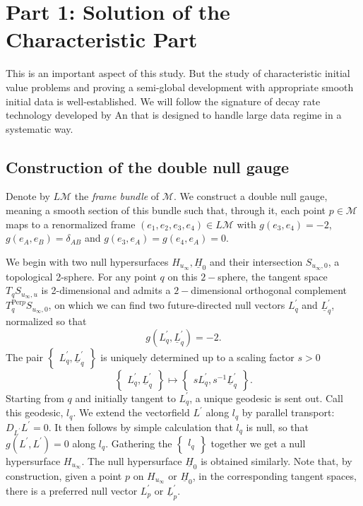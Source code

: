 \documentclass{amsart}
\newcommand{\Lbar}{\underline{L}}
\newcommand{\Hbar}{\underline{H}}
\begin{document}
 \section{Part 1: Solution of the Characteristic Part}
 \label{semiglobal}
 \noindent This is an important aspect of this study. But the study of characteristic initial value problems and proving a semi-global development with appropriate smooth initial data is well-established. We will follow the signature of decay rate technology developed by An \cite{An} that is designed to handle large data regime in a systematic way.
	\subsection{Construction of the double null gauge}
	
	
\noindent Denote by $L\mathcal{M}$ the \textit{frame bundle} of $\mathcal{M}$. We construct a double null gauge, meaning a smooth section of this bundle such that, through it, each point $p \in \mathcal{M}$ maps to a renormalized frame $(e_1, e_2, e_3, e_4) \in L\mathcal{M}$ with $g(e_3, e_4) =-2$, $g(e_A, e_B) = \delta_{AB}$ and $g(e_3, e_A) = g(e_4, e_A) =0$.
    
    \vspace{3mm}
  \noindent  We begin with two null hypersurfaces $H_{u_{\infty}}, \Hbar_0$ and their intersection $S_{u_{\infty},0}$, a topological 2-sphere. For any point $q$ on this $2-$sphere, the tangent space $T_qS_{u_{\infty},u}$ is 2-dimensional and admits a $2-$dimensional orthogonal complement $T_q^{\text{Per}p}{S_{u_{\infty},0}}$, on which we can find two future-directed null vectors $L^{\prime}_q$ and $\Lbar^{\prime}_q$, normalized so that  \[ g(L^{\prime}_q, \Lbar^{\prime}_q) = -2. \]The pair $\begin{Bmatrix} L^{\prime}_q, \Lbar^{\prime}_q\end{Bmatrix}$ is uniquely determined up to a scaling factor $s >0$ \[\begin{Bmatrix} L^{\prime}_q, \Lbar^{\prime}_q\end{Bmatrix} \mapsto \begin{Bmatrix} s L^{\prime}_q, s^{-1}\Lbar^{\prime}_q\end{Bmatrix}.\]
	Starting from $q$ and initially tangent to $L^{\prime}_q$, a unique geodesic is sent out. Call this geodesic, $l_q$. We extend the vectorfield $L^{\prime}$ along $l_q$ by parallel transport: $D_{L^{\prime}}L^{\prime} =0$. It then follows by simple calculation that $l_q$ is null, so that $g(L^{\prime}, L^{\prime}) =0$ along $l_q$. Gathering the $\begin{Bmatrix} l_q \end{Bmatrix}$ together we get a null hypersurface $H_{u_{\infty}}$. The null hypersurface $\Hbar_0$ is obtained similarly.
	Note that, by construction, given a point $p$ on $H_{u_{\infty}}$ or $\Hbar_0$, in the corresponding tangent spaces, there is a preferred null vector $L^{\prime}_p$ or $\Lbar^{\prime}_p$.
	
\end{document}
